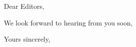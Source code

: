 \documentclass[11pt]{letter}
\begin{document}
\begin{letter}{}
\opening{Dear Editors,}




We look forward to hearing from you soon,

\closing{Yours sincerely,}


\end{letter}
\end{document}
